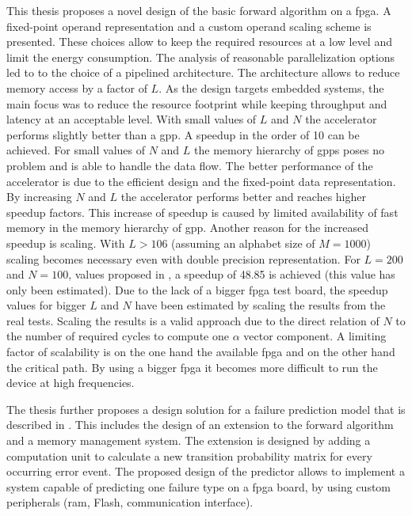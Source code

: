 \documentclass[mscthesis]{usiinfthesis}
\begin{document}
This thesis proposes a novel design of the basic forward algorithm on
a \gls{fpga}. A fixed-point operand representation and a custom operand scaling
scheme is presented. These choices allow to keep the required resources at
a low level and limit the energy consumption. The analysis of reasonable
parallelization options led to to the choice of a pipelined architecture. The
architecture allows to reduce memory access by a factor of $L$. As the design
targets embedded systems, the main focus was to reduce the resource footprint
while keeping throughput and latency at an acceptable level. With small values
of $L$ and $N$ the accelerator performs slightly better than a \gls{gpp}.
A speedup in the order of 10 can be achieved. For small values of $N$ and $L$
the memory hierarchy of \glspl{gpp} poses no problem and is able to handle the
data flow. The better performance of the accelerator is due to the efficient
design and the fixed-point data representation. By increasing $N$ and $L$ the
accelerator performs better and reaches higher speedup factors. This increase
of speedup is caused by limited availability of fast memory in the memory
hierarchy of \gls{gpp}. Another reason for the increased speedup is scaling.
With $L > 106$ (assuming an alphabet size of $M=1000$) scaling becomes
necessary even with double precision representation. For $L=200$ and $N=100$,
values proposed in \cite{salfner08}, a speedup of 48.85 is achieved (this value
has only been estimated).  Due to the lack of a bigger \gls{fpga} test board,
the speedup values for bigger $L$ and $N$ have been estimated by scaling the
results from the real tests. Scaling the results is a valid approach due to the
direct relation of $N$ to the number of required cycles to compute one $\alpha$
vector component. A limiting factor of scalability is on the one hand the
available \gls{fpga} and on the other hand the critical path. By using a bigger
\gls{fpga} it becomes more difficult to run the device at high frequencies.

The thesis further proposes a design solution for a failure prediction model
that is described in \cite{salfner08}. This includes the design of an extension
to the forward algorithm and a memory management system. The extension is
designed by adding a computation unit to calculate a new transition probability
matrix for every occurring error event. The proposed design of the predictor
allows to implement a system capable of predicting one failure type on
a \gls{fpga} board, by using custom peripherals (\gls{ram}, Flash,
communication interface).
\end{document}
